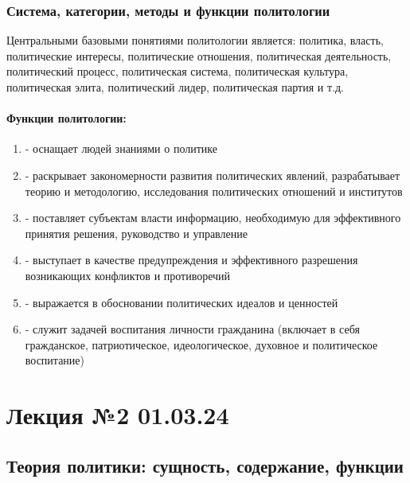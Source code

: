 \subsection{Система, категории, методы и функции политологии}

Центральными базовыми понятиями политологии является: политика, власть, политические
интересы, политические отношения, политическая деятельность, политический процесс,
политическая система, политическая культура, политическая элита, политический лидер,
политическая партия и т.д.

\subsubsection{Функции политологии:}

\begin{enumerate}
      \item {} - оснащает людей
            знаниями о политике
      \item {} - раскрывает закономерности развития
            политических явлений, разрабатывает теорию и методологию, исследования
            политических отношений и институтов
      \item {} - поставляет субъектам власти информацию,
            необходимую для эффективного принятия решения, руководство и управление
      \item {} - выступает в качестве предупреждения и
            эффективного разрешения возникающих конфликтов и противоречий
      \item {} - выражается в обосновании политических идеалов
            и ценностей
      \item {} - служит задачей воспитания личности гражданина
            (включает в себя гражданское, патриотическое, идеологическое, духовное и
            политическое воспитание)
\end{enumerate}

\chapter{Лекция №2 01.03.24}

\section{Теория политики: сущность, содержание, функции}

